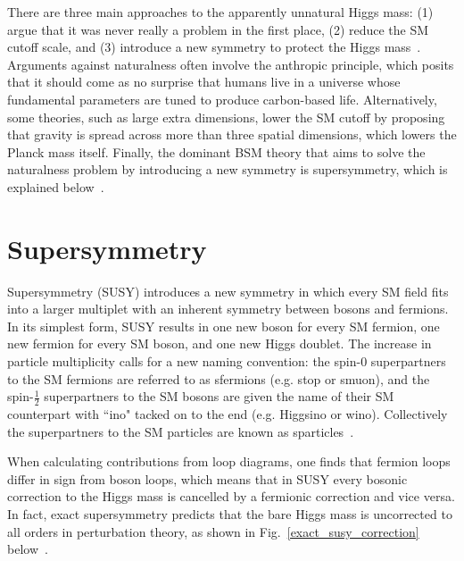 \documentclass[12pt]{article}
\begin{document}
     There are three main approaches to the apparently unnatural Higgs mass: (1) argue that it was never really a problem in the first place, (2) reduce the SM cutoff scale, and (3) introduce a new symmetry to protect the Higgs mass~\cite{craig}. Arguments against naturalness often involve the anthropic principle, which posits that it should come as no surprise that humans live in a universe whose fundamental parameters are tuned to produce carbon-based life. Alternatively, some theories, such as large extra dimensions, lower the SM cutoff by proposing that gravity is spread across more than three spatial dimensions, which lowers the Planck mass itself. Finally, the dominant BSM theory that aims to solve the naturalness problem by introducing a new symmetry is supersymmetry, which is explained below~\cite{dine_naturalness}.
    
\section{Supersymmetry}

    Supersymmetry (SUSY) introduces a new symmetry in which every SM field fits into a larger multiplet with an inherent symmetry between bosons and fermions. In its simplest form, SUSY results in one new boson for every SM fermion, one new fermion for every SM boson, and one new Higgs doublet. The increase in particle multiplicity calls for a new naming convention: the spin-0 superpartners to the SM fermions are referred to as sfermions (e.g. stop or smuon), and the spin-$\frac{1}{2}$ superpartners to the SM bosons are given the name of their SM counterpart with ``ino" tacked on to the end (e.g. Higgsino or wino). Collectively the superpartners to the SM particles are known as sparticles~\cite{primer}.

    When calculating contributions from loop diagrams, one finds that fermion loops differ in sign from boson loops, which means that in SUSY every bosonic correction to the Higgs mass is cancelled by a fermionic correction and vice versa. In fact, exact supersymmetry predicts that the bare Higgs mass is uncorrected to all orders in perturbation theory, as shown in Fig.~\ref{exact_susy_correction} below~\cite{primer}.
    
\end{document}

